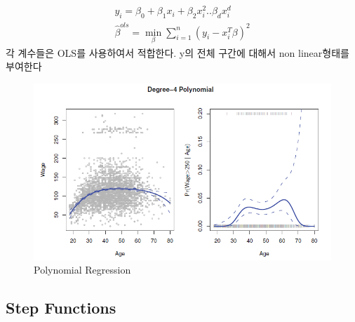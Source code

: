 \documentclass[11pt]{article}
\begin{document}
  \begin{align}
	y_{i} = \beta_{0} + \beta_{1}x_{i} + \beta_{2}x_{i}^2  .. \beta_{d}x_{i}^d \\
    \hat{\beta}^{ols} = \min_{\beta} \sum\limits_{i=1}^n (y_{i} - x_{i}^T \beta)^2 
  \end{align}
각 계수들은 OLS를 사용하여서 적합한다. y의 전체 구간에 대해서 non linear형태를 부여한다

\begin{figure}[htbp]
\begin{center}
    \includegraphics[scale=1.2]{im1}
    \caption{Polynomial Regression} \label{fig:label}
\end{center}
\end{figure}
\subsection{Step Functions}
\end{document}
